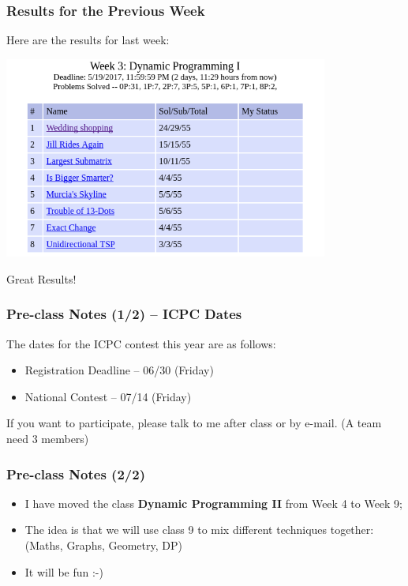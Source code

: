 \begin{frame}
  \frametitle{Results for the Previous Week}

  \begin{center}
    Here are the results for last week:

    \bigskip
    
    \includegraphics[width=0.8\textwidth]{img/resultsW3}

    \bigskip
    
    Great Results!
    
  \end{center}
\end{frame}

\begin{frame}
  \frametitle{Pre-class Notes (1/2) -- ICPC Dates}

  The dates for the ICPC contest this year are as follows:

  \bigskip
  
  \begin{itemize}
  \item Registration Deadline -- 06/30 (Friday)
  \item National Contest -- 07/14 (Friday)
  \end{itemize}

  \bigskip

  If you want to participate, please talk to me after class or by
  e-mail. (A team need 3 members)
\end{frame}

\begin{frame}
  \frametitle{Pre-class Notes (2/2)}

  \begin{itemize}
  \item I have moved the class {\bf Dynamic Programming II} from
    Week 4 to Week 9;

    \bigskip
    
  \item The idea is that we will use class 9 to mix different
    techniques together: (Maths, Graphs, Geometry, DP)

    \bigskip
    
  \item It will be fun :-)
  \end{itemize}  
\end{frame}


